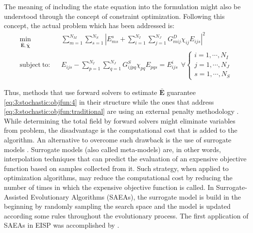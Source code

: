 			The meaning of including the state equation into the formulation might also be understood through the concept of constraint optimization. Following this concept, the actual problem which has been addressed is:
			\begin{align}
				\min\limits_{\mathbf{\bar{E}},\boldsymbol{\bar{\chi}}} &~~~ \sum\limits_{m=1}^{N_M}\sum\limits_{s=1}^{N_S} \left|E^s_{ms} + \sum\limits_{i=1}^{N_I}\sum\limits_{j=1}^{N_J} G^D_{mij}\chi_{ij}E_{ijs}\right|^2 \label{eq:3:stochastic:objfun:3} \\
				\mathrm{subject~to:} &~~~ E_{ijs} - \sum\limits_{p=1}^{N_I}\sum\limits_{q=1}^{N_J}G^S_{ijpq}\chi_{pq}E_{pqs} = E^i_{ijs} ~~ \forall \begin{cases}i=1,\cdots,N_I \\j=1,\cdots,N_J\\s=1,\cdots,N_S \end{cases} \label{eq:3:stochastic:objfun:4}
			\end{align}
		
			Thus, methods that use forward solvers to estimate $\mathbf{\bar{E}}$ guarantee \eqref{eq:3:stochastic:objfun:4} in their structure while the ones that address \eqref{eq:3:stochastic:objfun:traditional} are using an external penalty methodology \citep{rao2019introduction}. While determining the total field by forward solvers might eliminate variables from problem, the disadvantage is the computational cost that is added to the algorithm. An alternative to overcome such drawback is the use of surrogate models \citep{he2023review}. Surrogate models (also called meta-models) are, in other words, interpolation techniques that can predict the evaluation of an expensive objective function based on samples collected from it. Such strategy, when applied to optimization algorithms, may reduce the computational cost by reducing the number of times in which the expensive objective function is called. In Surrogate-Assisted Evolutionary Algorithms (SAEAs), the surrogate model is build in the beginning by randomly sampling the search space and the model is updated according some rules throughout the evolutionary process. The first application of SAEAs  
			in EISP was accomplished by \cite{salucci2022learned}.
						
